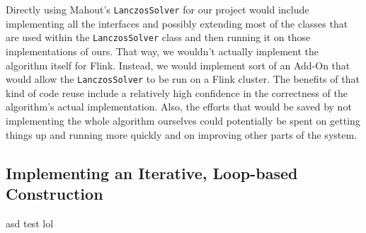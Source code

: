 
Directly using Mahout's \texttt{LanczosSolver} for our project would include implementing all
the interfaces and possibly extending most of the classes that are used within the
\texttt{LanczosSolver} class and then running it on those implementations of ours. That way, we
wouldn't actually implement the algorithm itself for Flink. Instead, we would implement sort of
an Add-On that would allow the \texttt{LanczosSolver} to be run on a Flink cluster. The benefits
of that kind of code reuse include a relatively high confidence in the correctness of the
algorithm's actual implementation. Also, the efforts that would be saved by not implementing the
whole algorithm ourselves could potentially be spent on getting things up and running more
quickly and on improving other parts of the system.

\subsection{Implementing an Iterative, Loop-based Construction}

asd test lol




